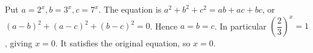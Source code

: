 Put $a=2^x,b=3^x,c=7^x$. The equation is $a^2+b^2+c^2=ab+ac+bc$, or $(a-b)^2+(a-c)^2+(b-c)^2=0$. Hence $a=b=c$. In particular $(\dfrac{2}{3})^x = 1$, giving $x=0$. It satisfies the original equation, so $\boxed{x=0}$.
